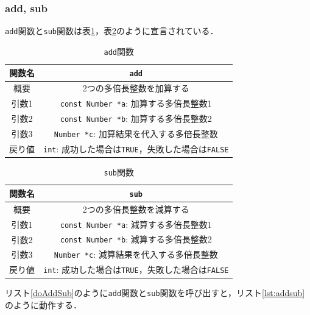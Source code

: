 \documentclass[a4paper,11pt,dvipdfmx]{jsarticle}
\begin{document}
\subsubsection{add, sub}
\texttt{add}関数と\texttt{sub}関数は表\ref{table:lst:add}，表\ref{table:lst:sub}のように宣言されている．

\begin{table}[H]
\centering
\caption{\texttt{add}関数}
\label{table:lst:add}
\begin{tabular}{c||c}
\hline
関数名    & \texttt{add}   \\
\hline
概要    & 2つの多倍長整数を加算する   \\
\hline
引数1   & \texttt{const Number *a}: 加算する多倍長整数1  \\
引数2   & \texttt{const Number *b}: 加算する多倍長整数2  \\
引数3   & \texttt{Number *c}: 加算結果を代入する多倍長整数  \\
\hline
戻り値    & \texttt{int}: 成功した場合は\texttt{TRUE}，失敗した場合は\texttt{FALSE}   \\
\hline
\end{tabular}
\end{table}

\begin{table}[H]
\centering
\caption{\texttt{sub}関数}
\label{table:lst:sub}
\begin{tabular}{c||c}
\hline
関数名    & \texttt{sub}   \\
\hline
概要    & 2つの多倍長整数を減算する   \\
\hline
引数1   & \texttt{const Number *a}: 減算する多倍長整数1  \\
引数2   & \texttt{const Number *b}: 減算する多倍長整数2  \\
引数3   & \texttt{Number *c}: 減算結果を代入する多倍長整数  \\
\hline
戻り値    & \texttt{int}: 成功した場合は\texttt{TRUE}，失敗した場合は\texttt{FALSE}   \\
\hline
\end{tabular}
\end{table}

リスト\ref{doAddSub}のように\texttt{add}関数と\texttt{sub}関数を呼び出すと，リスト\ref{lst:addsub}のように動作する．
\end{document}
